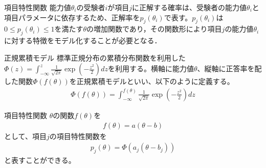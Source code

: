 \documentclass[aspectratio=169, dvipdfmx, 12pt]{beamer}
\begin{document}
\begin{frame}
\begin{block}{項目特性関数}
  能力値$\theta_i$の受験者$i$が項目$j$に正解する確率は、受験者の能力値$\theta_i$と項目パラメータに依存するため、正解率を$p_j(\theta_i)$で表す。$p_j(\theta_i)$は $0 \leq p_j(\theta_i) \leq 1 $を満たす$\theta$の増加関数であり，その関数形により項目$j$の能力値$\theta_i$に対する特徴をモデル化することが必要となる．
\end{block}
\begin{block}{正規累積モデル}
標準正規分布の累積分布関数を利用した$\Phi(z) = \int_{-\infty}^{z}\frac{1}{\sqrt{2\pi}} \exp(-\frac{z^2}{2}) dz$を利用する。横軸に能力値$\theta$、縦軸に正答率を配した関数$\Phi(f(\theta))$を正規累積モデルといい、以下のように定義する。
\begin{align}
  \displaystyle
  \Phi(f(\theta))  = \int_{-\infty}^{f(\theta)} \frac{1}{\sqrt{2\pi}} \exp(-\frac{z^2}{2}) dz
\end{align}
\end{block}
\end{frame}

\begin{frame}
  \begin{block}{項目特性関数}
    $\theta$の関数$f(\theta)$を
    \begin{align}
      \displaystyle
        f(\theta) = a(\theta - b)
    \end{align}として、項目$j$の項目特性関数を
    \begin{align}
      \displaystyle
      p_j(\theta) = \Phi (a_j(\theta - b_j))
    \end{align}と表すことができる。
  \end{block}
\end{frame}
\end{document}
